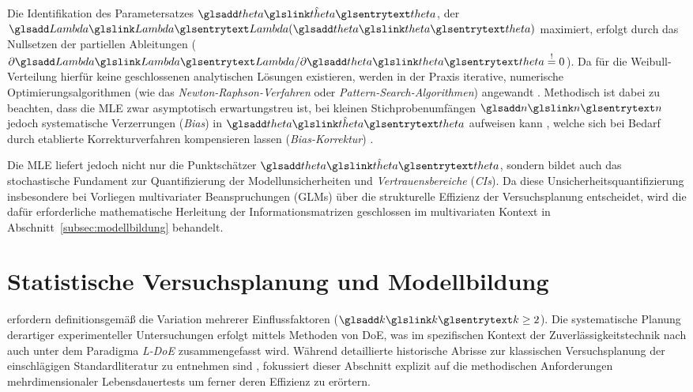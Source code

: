 Die Identifikation des Parametersatzes $\hat{\sym{theta}}$, der $\sym{Lambda}(\sym{theta})$ maximiert, erfolgt durch das Nullsetzen der partiellen Ableitungen ($\partial\sym{Lambda}/\partial \sym{theta} \stackrel{!}{=} 0$).
Da für die Weibull-Verteilung hierfür keine geschlossenen analytischen Lösungen existieren, werden in der Praxis iterative, numerische Optimierungsalgorithmen (wie das \textit{Newton-Raphson-Verfahren} oder \textit{Pattern-Search-Algorithmen}) angewandt \cite{Nelson.2005,Qiao.1994,Kremer.2019b}.
Methodisch ist dabei zu beachten, dass die \ac{MLE} zwar asymptotisch erwartungstreu ist, bei kleinen Stichprobenumfängen $\sym{n}$ jedoch systematische Verzerrungen (\textit{Bias}) in $\hat{\sym{theta}}$ aufweisen kann \cite{Abernethy.2006}, welche sich bei Bedarf durch etablierte Korrekturverfahren kompensieren lassen (\textit{Bias-Korrektur}) \cite{Hirose.1999,Ross.1996}.

Die \ac{MLE} liefert jedoch nicht nur die Punktschätzer $\hat{\sym{theta}}$, sondern bildet auch das stochastische Fundament zur Quantifizierung der Modellunsicherheiten und \textit{Vertrauensbereiche} (\textit{\acp{CI}}).
Da diese Unsicherheitsquantifizierung insbesondere bei Vorliegen multivariater Beanspruchungen (\acp{GLM}) über die strukturelle Effizienz der Versuchsplanung entscheidet, wird die dafür erforderliche mathematische Herleitung der Informationsmatrizen geschlossen im multivariaten Kontext in Abschnitt~\ref{subsec:modellbildung} behandelt.

\section{Statistische Versuchsplanung und Modellbildung} \label{sec:doe}

 erfordern definitionsgemäß die Variation mehrerer Einflussfaktoren ($\sym{k} \geq 2$).
Die systematische Planung derartiger experimenteller Untersuchungen erfolgt mittels Methoden von \ac{DoE}, was im spezifischen Kontext der Zuverlässigkeitstechnik nach \textcite{Kremer.2021} auch unter dem Paradigma \textit{\ac{L-DoE}} zusammengefasst wird.
Während detaillierte historische Abrisse zur klassischen Versuchsplanung der einschlägigen Standardliteratur zu entnehmen sind \cite{Fisher.1935, Box.1978, Montgomery.2020}, fokussiert dieser Abschnitt explizit auf die methodischen Anforderungen mehrdimensionaler Lebensdauertests um ferner deren Effizienz zu erörtern.

